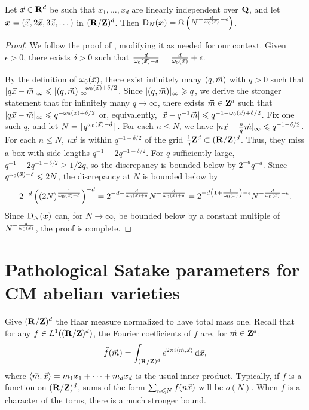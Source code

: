 \begin{theorem}\label{thm:disc-lower-bound}
Let $\vec{x}\in \mathbf{R}^d$ be such that $x_1,\dots,x_d$ are linearly independent over 
$\mathbf{Q}$, and let ${\boldsymbol x}=(\vec{x},2\vec{x},3\vec{x},\dots)$ in $(\mathbf{R}/\mathbf{Z})^d$. Then 
$\operatorname{D}_N({\boldsymbol x}) = \Omega\left(N^{-\frac{d}{\omega_0(\vec{x})}-\epsilon} \right)$. 
\end{theorem}
\begin{proof}
We follow the proof of \cite[Ch.~2, Th.~3.3]{kuipers-niederreiter-1974}, 
modifying it as needed for our context. Given $\epsilon>0$, there exists 
$\delta>0$ such that 
$\frac{d}{\omega_0(\vec{x})-\delta} = \frac{d}{\omega_0(\vec{x})} + \epsilon$. 

By the definition of $\omega_0(\vec{x})$, there exist infinitely many 
$(q,\vec{m})$ with $q>0$ such that 
$|q \vec{x} - \vec{m}|_\infty \leqslant |(q,\vec{m})|_\infty^{-\omega_0(\vec{x})+\delta/2}$. 
Since $|(q,\vec{m})|_\infty \geqslant q$, we derive the stronger 
statement that for infinitely many $q\to \infty$, there exists 
$\vec{m}\in \mathbf{Z}^d$ such that 
$|q \vec{x}-\vec{m}|_\infty \leqslant q^{-\omega_0(\vec{x})+\delta/2}$ or, equivalently, 
$|\vec{x}-q^{-1}\vec{m}| \leqslant q^{-1-\omega_0(\vec{x})+\delta/2}$. Fix one such $q$, 
and let $N=\lfloor q^{\omega_0(\vec{x})-\delta}\rfloor$. For each $n\leqslant N$, 
we have $|n \vec{x} - \frac n q \vec{m}|_\infty \leqslant q^{-1-\delta/2}$. For each 
$n\leqslant N$, $n \vec{x}$ is within $q^{-1-\delta/2}$ of the grid 
$\frac 1 q \mathbf{Z}^d\subset (\mathbf{R}/\mathbf{Z})^d$. Thus, they miss a box with side lengths 
$q^{-1} - 2 q^{-1-\delta/2}$. For $q$ sufficiently large, 
$q^{-1} - 2 q^{-1-\delta/2} \geqslant 1/2q$, so the discrepancy is 
bounded below by $2^{-d} q^{-d}$. Since $q^{\omega_0(\vec{x})-\delta} \leqslant 2 N$, 
the discrepancy at $N$ is bounded below by 
\[
	2^{-d} \left( (2 N)^{\frac{1}{\omega_0(\vec{x})+\delta}}\right)^{-d} 
		= 2^{-d-\frac{d}{\omega_0(\vec{x})+\delta}} N^{-\frac{d}{\omega_0(\vec{x})+\delta}}
		= 2^{-d\left(1+\frac{1}{\omega_0(\vec{x})}\right)-\epsilon} N^{-\frac{d}{\omega_0(\vec{x})}-\epsilon} .
\]
Since $\operatorname{D}_N({\boldsymbol x})$ can, for $N\to \infty$, be bounded below by a constant 
multiple of $N^{-\frac{d}{\omega_0(\vec{x})}}$, the proof is complete.
\end{proof}






\section{Pathological Satake parameters for CM abelian varieties}

Give $(\mathbf{R}/\mathbf{Z})^d$ the Haar measure normalized to have total mass one. 
Recall that for any $f\in L^1((\mathbf{R}/\mathbf{Z})^d)$, the Fourier coefficients of $f$ 
are, for $\vec{m}\in \mathbf{Z}^d$: 
\[
	\widehat f(\vec{m}) = \int_{(\mathbf{R}/\mathbf{Z})^d} e^{2\pi i \langle \vec{m},\vec{x}\rangle} \, \mathrm{d} \vec{x} ,
\]
where $\langle \vec{m},\vec{x}\rangle = m_1 x_1 + \cdots + m_d x_d$ is the usual inner 
product. Typically, if $f$ is a function on $(\mathbf{R}/\mathbf{Z})^d$, sums of the form 
$\sum_{n\leqslant N} f(n \vec{x})$ will be $o(N)$. When $f$ is a character of the 
torus, there is a much stronger bound. 

